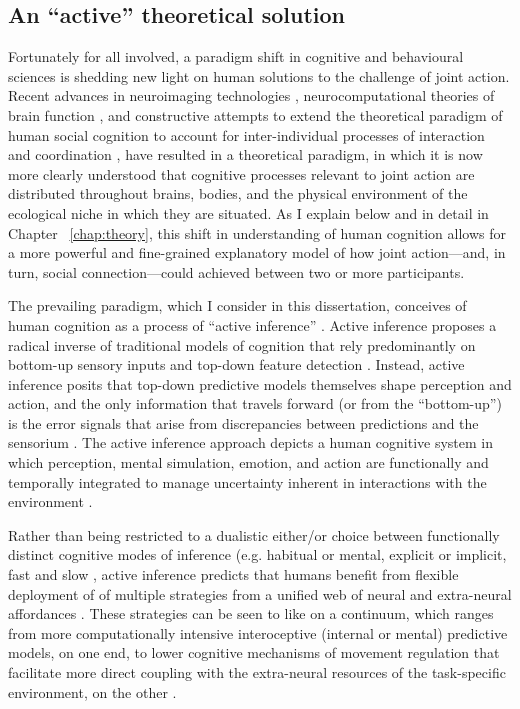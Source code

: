 \begin{CJK}{UTF8}{gbsn}
\subsection{An ``active'' theoretical solution}
Fortunately for all involved, a paradigm shift in cognitive and behavioural sciences is shedding new light on human solutions to the challenge of joint action.  Recent advances in neuroimaging technologies \citep{Frith2007}, neurocomputational theories of brain function \citep{Friston2010,Frith2010,Yufik2013,Clark2013}, and constructive attempts to extend the theoretical paradigm of human social cognition to account for inter-individual processes of interaction and coordination \citep{Sebanz2006,Dale2014}, have resulted in a theoretical paradigm, in which it is now more clearly understood that cognitive processes relevant to joint action are distributed throughout brains, bodies, and the physical environment of the ecological niche in which they are situated.  As I explain below and in detail in Chapter ~\ref{chap:theory}, this shift in understanding of human cognition allows for a more powerful and fine-grained explanatory model of how joint action---and, in turn, social connection---could achieved between two or more participants.

The prevailing paradigm, which I consider in this dissertation, conceives of human cognition as a process of ``active inference'' \citep{Friston2010}.  Active inference \citep[and the predictive coding paradigm which it extends, see][]{Clark2013} proposes a radical inverse of traditional models of cognition that rely predominantly on bottom-up sensory inputs and top-down feature detection \citep{Marr1982}. Instead, active inference posits that top-down predictive models themselves shape perception and action, and the only information that travels forward (or from the ``bottom-up'') is the error signals that arise from discrepancies between predictions and the sensorium \citep{Clark2015}.  The active inference approach  depicts a human cognitive system in which perception, mental simulation, emotion, and action are functionally and temporally integrated to manage uncertainty inherent in interactions with the environment \citep{Clark2013}.

Rather than being restricted to a dualistic either/or choice between functionally distinct cognitive modes of inference (e.g. habitual or mental, explicit or implicit, fast and slow \citep[cf.][]{Dienes1999,Kahneman2011}, active inference predicts that humans benefit from flexible deployment of of multiple strategies from a unified web of neural and extra-neural affordances \citep{Pezzulo2013,Clark2015}.  These strategies can be seen to like on a continuum, which ranges from more computationally intensive interoceptive (internal or mental) predictive models, on one end, to lower cognitive mechanisms of movement regulation that facilitate more direct coupling with the extra-neural resources of the task-specific environment, on the other \citep{Riley2011}.


\end{CJK}
